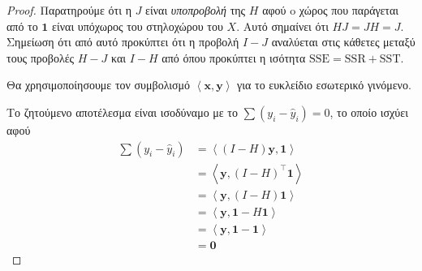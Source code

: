 \documentclass{article}
\newcommand{\inner}[2]{\left\langle #1 \mathrel{,} #2 \right\rangle}
\newcommand{\T}[1]{{#1}^{\top}}  %
\newcommand{\SSE}{\mathrm{SSE}}
\newcommand{\SSR}{\mathrm{SSR}}
\newcommand{\SST}{\mathrm{SST}}
\newcommand{\ve}[1]{\boldsymbol{#1}}
\begin{document}
\begin{proof}
    Παρατηρούμε ότι η \(J\) είναι \emph{υποπροβολή} της \(H\) αφού o χώρος που παράγεται από το \(\ve{1}\) είναι υπόχωρος του στηλοχώρου του \(X\).
    Αυτό σημαίνει ότι \(HJ = JH = J\).
    Σημείωση ότι από αυτό προκύπτει ότι η προβολή \(I - J\) αναλύεται στις κάθετες μεταξύ τους προβολές \(H - J\) και \(I - H\) από όπου προκύπτει η ισότητα \(\SSE = \SSR + \SST\).

    Θα χρησιμοποίησουμε τον συμβολισμό \(\inner{\ve{x}}{\ve{y}}\) για το ευκλείδιο εσωτερικό γινόμενο.

    Το ζητούμενο αποτέλεσμα είναι ισοδύναμο με το \(\sum (y_i - \hat{y}_i) = 0\), το οποίο ισχύει αφού
    \begin{equation*}
    \begin{split}
        \sum (y_i - \hat{y}_i) &= \inner{(I - H) \ve{y}}{\ve{1}}\\
        &= \inner{\ve{y}}{\T{(I - H)} \ve{1}}\\
        &= \inner{\ve{y}}{(I - H) \ve{1}}\\
        &= \inner{\ve{y}}{\ve{1} - H \ve{1}}\\
        &= \inner{\ve{y}}{\ve{1} - \ve{1}}\\
        &= \ve{0}
    \end{split}
    \end{equation*}
\end{proof}
\end{document}
